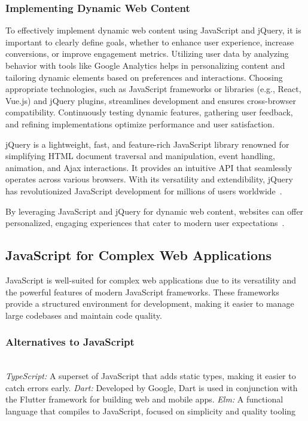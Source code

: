 \documentclass[conference]{IEEEtran}
\begin{document}
\subsubsection{Implementing Dynamic Web Content}

To effectively implement dynamic web content using JavaScript and jQuery, it is important to clearly define goals, whether to enhance user experience, increase conversions, or improve engagement metrics. Utilizing user data by analyzing behavior with tools like Google Analytics helps in personalizing content and tailoring dynamic elements based on preferences and interactions. Choosing appropriate technologies, such as JavaScript frameworks or libraries (e.g., React, Vue.js) and jQuery plugins, streamlines development and ensures cross-browser compatibility. Continuously testing dynamic features, gathering user feedback, and refining implementations optimize performance and user satisfaction.

jQuery is a lightweight, fast, and feature-rich JavaScript library renowned for simplifying HTML document traversal and manipulation, event handling, animation, and Ajax interactions. It provides an intuitive API that seamlessly operates across various browsers. With its versatility and extendibility, jQuery has revolutionized JavaScript development for millions of users worldwide~\cite{jquery_history}.

By leveraging JavaScript and jQuery for dynamic web content, websites can offer personalized, engaging experiences that cater to modern user expectations~\cite{moldstud2024}.
\newline
\subsection{JavaScript for Complex Web Applications}

JavaScript is well-suited for complex web applications due to its versatility and the powerful features of modern JavaScript frameworks. These frameworks provide a structured environment for development, making it easier to manage large codebases and maintain code quality.
\newline
\subsubsection{Alternatives to JavaScript}

\textit{\\TypeScript:} A superset of JavaScript that adds static types, making it easier to catch errors early.
\newline\textit{Dart:} Developed by Google, Dart is used in conjunction with the Flutter framework for building web and mobile apps.
\newline\textit{Elm:} A functional language that compiles to JavaScript, focused on simplicity and quality tooling~\cite{mdn-js-guide}
\end{document}
